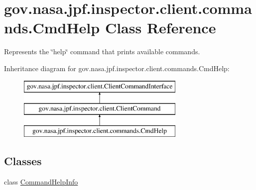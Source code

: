 \hypertarget{classgov_1_1nasa_1_1jpf_1_1inspector_1_1client_1_1commands_1_1_cmd_help}{}\section{gov.\+nasa.\+jpf.\+inspector.\+client.\+commands.\+Cmd\+Help Class Reference}
\label{classgov_1_1nasa_1_1jpf_1_1inspector_1_1client_1_1commands_1_1_cmd_help}


Represents the \char`\"{}help\char`\"{} command that prints available commands.  


Inheritance diagram for gov.\+nasa.\+jpf.\+inspector.\+client.\+commands.\+Cmd\+Help\+:\begin{figure}[H]
\begin{center}
\leavevmode
\includegraphics[height=3.000000cm]{classgov_1_1nasa_1_1jpf_1_1inspector_1_1client_1_1commands_1_1_cmd_help}
\end{center}
\end{figure}
\subsection*{Classes}
\begin{DoxyCompactItemize}
\item 
class \hyperlink{classgov_1_1nasa_1_1jpf_1_1inspector_1_1client_1_1commands_1_1_cmd_help_1_1_command_help_info}{Command\+Help\+Info}
\end{DoxyCompactItemize}
